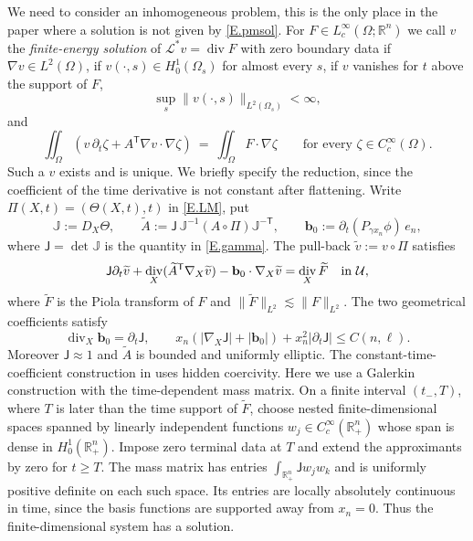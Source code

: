 \documentclass[12pt,leqno]{amsart}
\numberwithin{equation}{section}
\DeclareMathOperator{\divg}{div}
\newcommand{\R}{\mathbb R}
\newcommand{\br}[1]{\left(#1\right)}
\newcommand{\om}{\Omega}
\newcommand{\pd}{\partial}
\newcommand{\LL}{\mathcal L}
\newcommand{\Uc}{\mathcal U}
\theoremstyle{plain}
\theoremstyle{remark}
\begin{document}
We need to consider an  inhomogeneous problem, this is  the only place in the paper
where a solution is not given by \eqref{E.pmsol}. For
$F\in L^\infty_c(\om;\R^n)$ we call $v$ the \emph{finite-energy solution} of
$\LL^*v=\divg F$ with zero boundary data if $\nabla v\in L^2(\om)$, if
$v(\cdot,s)\in H^1_0(\om_s)$ for almost every $s$, if $v$ vanishes for $t$ above
the support of $F$, 
$$\sup_s\|v(\cdot,s)\|_{L^2(\om_s)}<\infty,$$
and
\begin{equation}\label{E.PDweak}
  \iint_\om\br{v\,\pd_t\zeta+A^{\mathsf T}\nabla v\cdot\nabla\zeta}
  \ =\ \iint_\om F\cdot\nabla\zeta
  \qquad\text{for every }\zeta\in C^\infty_c(\om) .
\end{equation}
Such a $v$ exists and is unique. We briefly specify the reduction, since the
coefficient of the time derivative is not constant after flattening. Write
$\Pi(X,t)=(\Theta(X,t),t)$ in \eqref{E.LM}, put
$$\mathbb J:=D_X\Theta,\qquad
  \widetilde A:=\mathsf J\,\mathbb J^{-1}(A\circ\Pi)\mathbb J^{-\mathsf T},
  \qquad
  \mathbf b_0:=\pd_t(P_{\gamma x_n}\phi)\,e_n,$$
where $\mathsf J=\det\mathbb J$ is the quantity in \eqref{E.gamma}. The
pull-back $\widetilde v:=v\circ\Pi$ satisfies
\begin{equation}\label{E.PDpull}
 \mathsf J\pd_t\widetilde v
 +\divg_X(\widetilde A^{\mathsf T}\nabla_X\widetilde v)
 -\mathbf b_0\cdot\nabla_X\widetilde v
 =\divg_X\widetilde F
 \quad\hbox{in }\Uc,
\end{equation}
where $\widetilde F$ is the Piola transform of $F$ and
$\|\widetilde F\|_{L^2}\lesssim\|F\|_{L^2}$. The two geometrical coefficients
satisfy
\begin{equation}\label{E.PDstructure}
 \divg_X\mathbf b_0=\pd_t\mathsf J,\qquad
 x_n\br{|\nabla_X\mathsf J|+|\mathbf b_0|}
 +x_n^2|\pd_t\mathsf J|\le C(n,\ell).
\end{equation}
Moreover $\mathsf J\approx1$ and $\widetilde A$ is bounded and uniformly
elliptic. The constant-time-coefficient construction in
\cite[\S1.5]{AEN} uses hidden coercivity. Here we use a Galerkin construction
with the time-dependent mass matrix. On a finite interval $(t_-,T)$,
where $T$ is later than the time support of $\widetilde F$, choose nested
finite-dimensional spaces spanned by linearly independent functions
$w_j\in C_c^\infty(\R^n_+)$ whose span is dense in $H^1_0(\R^n_+)$.
Impose zero terminal data at $T$ and extend the approximants by zero
for $t\ge T$.
The mass matrix has entries $\int_{\R^n_+}\mathsf J w_jw_k$ and is uniformly
positive definite on each such space. Its entries are locally absolutely
continuous in time, since the basis functions are supported away from
$x_n=0$. Thus the finite-dimensional system has a solution.
\end{document}
